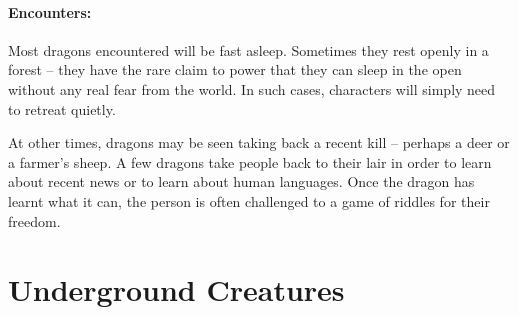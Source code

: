 \begin{multicols}{2}
\begin{boxtext}
\end{boxtext}

	\paragraph{Encounters:} Most dragons encountered will be fast asleep.  Sometimes they rest openly in a forest -- they have the rare claim to power that they can sleep in the open without any real fear from the world.  In such cases, characters will simply need to retreat quietly.

	At other times, dragons may be seen taking back a recent kill -- perhaps a deer or a farmer's sheep.  A few dragons take people back to their lair in order to learn about recent news or to learn about human languages.  Once the dragon has learnt what it can, the person is often challenged to a game of riddles for their freedom.  

\dragon

\end{multicols}

\section{Underground Creatures}


